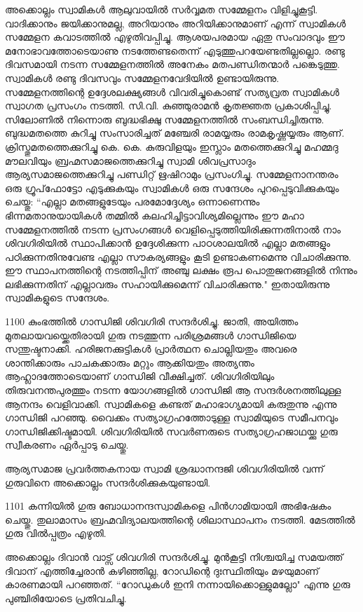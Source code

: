 \documentclass[12pt,openany]{book}
\begin{document}
	അക്കൊല്ലം സ്വാമികൾ ആലുവായിൽ സർവ്വമത സമ്മേളനം വിളിച്ചുകൂട്ടി. വാദിക്കാനും ജയിക്കാനുമല്ല, അറിയാനും അറിയിക്കാനുമാണ് എന്ന് സ്വാമികൾ സമ്മേളന കവാടത്തിൽ എഴുതിവപ്പിച്ചു. ആശയപരമായ ഏതു സംവാദവും ഈ മനോഭാവത്തോടെയാണു നടത്തേണ്ടതെന്ന് എടുത്തുപറയേണ്ടതില്ലല്ലൊ. രണ്ടു ദിവസമായി നടന്ന സമ്മേളനത്തിൽ അനേകം മതപണ്ഡിതന്മാർ പങ്കെടുത്തു. സ്വാമികൾ രണ്ടു ദിവസവും സമ്മേളനവേദിയിൽ ഉണ്ടായിരുന്നു. സമ്മേളനത്തിന്റെ ഉദ്ദേശലക്ഷ്യങ്ങൾ വിവരിച്ചുകൊണ്ട് സത്യവ്രത സ്വാമികൾ സ്വാഗത പ്രസംഗം നടത്തി. സി.വി. കുഞ്ഞുരാമൻ കൃതജ്ഞത പ്രകാശിപ്പിച്ചു. സിലോണിൽ നിന്നൊരു ബുദ്ധഭിക്ഷു സമ്മേളനത്തിൽ സംബന്ധിച്ചിരുന്നു. ബുദ്ധമതത്തെ കുറിച്ചു സംസാരിച്ചത് മഞ്ചേരി രാമയ്യരും രാമകൃഷ്ണയ്യരും ആണ്. ക്രിസ്തുമതത്തെക്കുറിച്ചു കെ. കെ. കുരുവിളയും ഇസ്ലാം മതത്തെക്കുറിച്ചു മഹമ്മദു മൗലവിയും ബ്രഹ്മസമാജത്തെക്കുറിച്ചു സ്വാമി ശിവപ്രസാദും ആര്യസമാജത്തെക്കുറിച്ചു പണ്ഡിറ്റ് ഋഷിറാമും പ്രസംഗിച്ചു. സമ്മേളനാനന്തരം ഒരു ഗ്രൂപ്‌ഫോട്ടോ എടുക്കുകയും സ്വാമികൾ ഒരു സന്ദേശം പുറപ്പെടുവിക്കുകയും ചെയ്തു: ``എല്ലാ മതങ്ങളുടേയും പരമോദ്ദേശ്യം ഒന്നാണെന്നും ഭിന്നമതാനുയായികൾ തമ്മിൽ കലഹിച്ചിട്ടാവിശ്യമില്ലെന്നും ഈ മഹാ സമ്മേളനത്തിൽ നടന്ന പ്രസംഗങ്ങൾ വെളിപ്പെടുത്തിയിരിക്കുന്നതിനാൽ നാം ശിവഗിരിയിൽ സ്ഥാപിക്കാൻ ഉദ്ദേശിക്കുന്ന പാഠശാലയിൽ എല്ലാ മതങ്ങളും പഠിക്കുന്നതിനുവേണ്ട എല്ലാ സൗകര്യങ്ങളും കൂടി ഉണ്ടാകണമെന്നു വിചാരിക്കുന്നു. ഈ സ്ഥാപനത്തിന്റെ നടത്തിപ്പിന് അഞ്ചു ലക്ഷം രൂപ പൊതുജനങ്ങളിൽ നിന്നും ലഭിക്കുന്നതിന് എല്ലാവരും സഹായിക്കുമെന്ന് വിചാരിക്കുന്നു." ഇതായിരുന്നു സ്വാമികളുടെ സന്ദേശം.
	
	1100 കുംഭത്തിൽ ഗാന്ധിജി ശിവഗിരി സന്ദർശിച്ചു. ജാതി, അയിത്തം മുതലായവയ്ക്കെതിരായി ഗുരു നടത്തുന്ന പരിശ്രമങ്ങൾ ഗാന്ധിജിയെ സന്തുഷ്ടനാക്കി. ഹരിജനക്കുട്ടികൾ പ്രാർത്ഥന ചൊല്ലിയതും അവരെ ശാന്തിക്കാരും പാചകക്കാരും മറ്റും ആക്കിയതും അത്യന്തം ആഹ്ലാദത്തോടെയാണ് ഗാന്ധിജി വീക്ഷിച്ചത്. ശിവഗിരിയിലും തിരുവനന്തപുരത്തും നടന്ന യോഗങ്ങളിൽ ഗാന്ധിജി ആ സന്ദർശനത്തിലുള്ള ആനന്ദം വെളിവാക്കി. സ്വാമികളെ കണ്ടത് മഹാഭാഗ്യമായി കരുതുന്നു എന്നു ഗാന്ധിജി പറഞ്ഞു. വൈക്കം സത്യാഗ്രഹത്തോടുള്ള സ്വാമിയുടെ സമീപനവും ഗാന്ധിജിക്കിഷ്ടമായി. ശിവഗിരിയിൽ സവർണരുടെ സത്യാഗ്രഹജാഥയ്ക്കു ഗുരു സ്വീകരണം ഏർപ്പാടു ചെയ്തു.
	
	ആര്യസമാജ പ്രവർത്ത‌കനായ സ്വാമി ശ്രദ്ധാനന്ദജി ശിവഗിരിയിൽ വന്ന് ഗുരുവിനെ അക്കൊല്ലം സന്ദർശിക്കുകയുണ്ടായി.
	
	1101 കന്നിയിൽ ഗുരു ബോധാനന്ദസ്വാമികളെ പിൻഗാമിയായി അഭിഷേകം ചെയ്തു. തുലാമാസം ബ്രഹ്മവിദ്യാലയത്തിന്റെ ശിലാസ്ഥാപനം നടത്തി. മേടത്തിൽ ഗുരു വിൽപ്പത്രം എഴുതി.
	
	അക്കൊല്ലം ദിവാൻ വാട്സ് ശിവഗിരി സന്ദർശിച്ചു. മുൻകൂട്ടി നിശ്ചയിച്ച സമയത്ത് ദിവാന് എത്തിച്ചേരാൻ കഴിഞ്ഞില്ല, റോഡിന്റെ ദുഃസ്ഥിതിയും മഴയുമാണ് കാരണമായി പറഞ്ഞത്. ``റോഡുകൾ ഇനി നന്നായിക്കൊള്ളുമല്ലോ" എന്നു ഗുരു പുഞ്ചിരിയോടെ പ്രതിവചിച്ചു.
	
\end{document}
